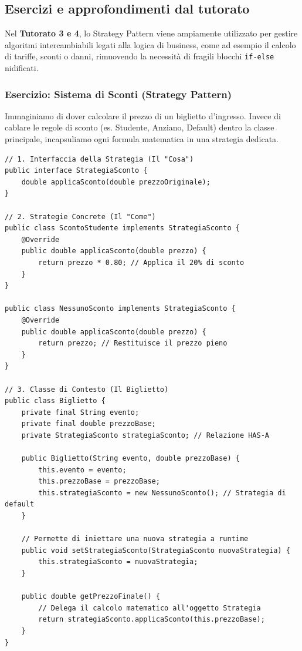 \documentclass[12pt, a4paper]{article}
\begin{document}
\subsection{Esercizi e approfondimenti dal tutorato}
Nel \textbf{Tutorato 3 e 4}, lo Strategy Pattern viene ampiamente utilizzato per gestire algoritmi intercambiabili legati alla logica di business, come ad esempio il calcolo di tariffe, sconti o danni, rimuovendo la necessità di fragili blocchi \texttt{if-else} nidificati.

\subsubsection{Esercizio: Sistema di Sconti (Strategy Pattern)}
Immaginiamo di dover calcolare il prezzo di un biglietto d'ingresso. Invece di cablare le regole di sconto (es. Studente, Anziano, Default) dentro la classe principale, incapsuliamo ogni formula matematica in una strategia dedicata.

\begin{verbatim}
// 1. Interfaccia della Strategia (Il "Cosa")
public interface StrategiaSconto {
    double applicaSconto(double prezzoOriginale);
}

// 2. Strategie Concrete (Il "Come")
public class ScontoStudente implements StrategiaSconto {
    @Override
    public double applicaSconto(double prezzo) {
        return prezzo * 0.80; // Applica il 20% di sconto
    }
}

public class NessunoSconto implements StrategiaSconto {
    @Override
    public double applicaSconto(double prezzo) {
        return prezzo; // Restituisce il prezzo pieno
    }
}

// 3. Classe di Contesto (Il Biglietto)
public class Biglietto {
    private final String evento;
    private final double prezzoBase;
    private StrategiaSconto strategiaSconto; // Relazione HAS-A

    public Biglietto(String evento, double prezzoBase) {
        this.evento = evento;
        this.prezzoBase = prezzoBase;
        this.strategiaSconto = new NessunoSconto(); // Strategia di default
    }

    // Permette di iniettare una nuova strategia a runtime
    public void setStrategiaSconto(StrategiaSconto nuovaStrategia) {
        this.strategiaSconto = nuovaStrategia;
    }

    public double getPrezzoFinale() {
        // Delega il calcolo matematico all'oggetto Strategia
        return strategiaSconto.applicaSconto(this.prezzoBase);
    }
}
\end{verbatim}
\end{document}
